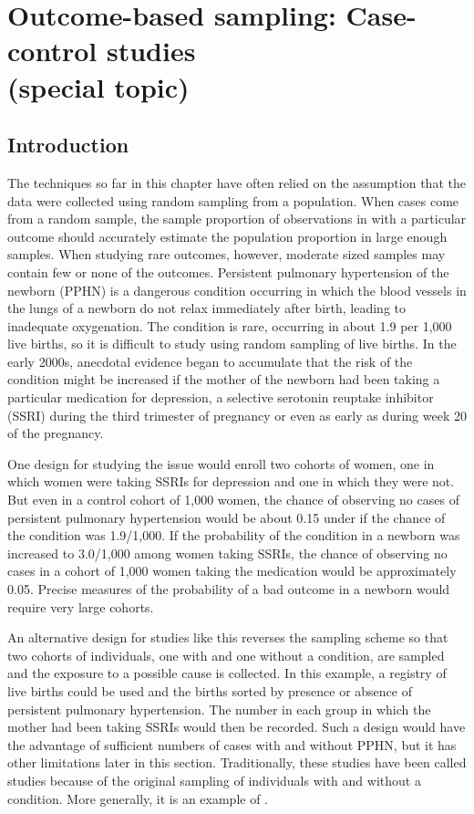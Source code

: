 \section{Outcome-based sampling: Case-control studies\\(special topic)}
\label{caseControStudies}


\subsection{Introduction}

The techniques so far in this chapter have often relied on the assumption that the data were collected using random sampling from a population.  When cases come from a random sample, the sample proportion of observations in with a particular outcome should accurately estimate the population proportion in large enough samples.  When studying rare outcomes, however, moderate sized samples may contain few or none of the outcomes.  Persistent pulmonary hypertension of the newborn (PPHN) is a dangerous condition occurring in which the blood vessels in the lungs of a newborn do not relax immediately after birth, leading to inadequate oxygenation.   The condition is rare, occurring in about 1.9 per 1,000 live births, so it is difficult to study using random sampling of live births.  In the early 2000s, anecdotal evidence began to accumulate that the risk of the condition might be increased if the mother of the newborn had been taking a particular medication for depression, a selective serotonin reuptake inhibitor (SSRI) during the third trimester of pregnancy or even as early as during week 20 of the pregnancy.  

One design for studying the issue would enroll two cohorts of women, one in which women were taking SSRIs for depression and one in which they were not.  But even in a control cohort of 1,000 women, the chance of observing no cases of persistent pulmonary hypertension would be about 0.15 under if the chance of the condition was 1.9/1,000.  If the probability of the condition in a newborn was increased to 3.0/1,000 among women taking SSRIs, the chance of observing no cases in a cohort of 1,000 women taking the medication would be approximately 0.05.  Precise measures of the probability of a bad outcome in a newborn would require very large cohorts.

An alternative design for studies like this reverses the sampling scheme so that two cohorts of individuals, one with and one without a condition, are sampled and the exposure to a possible cause is collected.  In this example, a registry of live births could be used and the births sorted by presence or absence of persistent pulmonary hypertension. The number in each group in which the mother had been taking SSRIs would then be recorded. Such a design would have the advantage of sufficient numbers of cases with and without PPHN, but it has other limitations later in this section. Traditionally, these studies have been called  studies because of the original sampling of individuals with and without a condition.  More generally, it is an example of .


